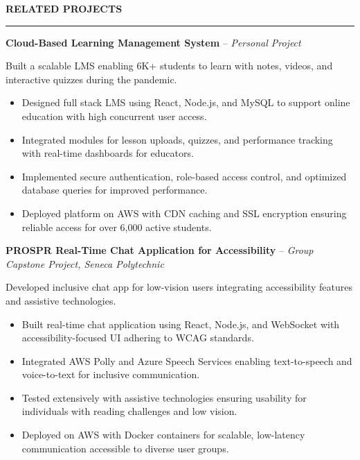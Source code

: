 \documentclass[10pt,letterpaper]{article}
\begin{document}
\vspace{6pt}

\textbf{RELATED PROJECTS}\\[-8pt]
\noindent\rule{\textwidth}{1pt}

\vspace{-2pt}

\textbf{Cloud-Based Learning Management System} -- \emph{Personal Project}

\vspace{-1pt}

Built a scalable LMS enabling 6K+ students to learn with notes, videos, and interactive quizzes during the pandemic.
\vspace{-1pt}
\begin{itemize}
\item Designed full stack LMS using React, Node.js, and MySQL to support online education with high concurrent user access.
\item Integrated modules for lesson uploads, quizzes, and performance tracking with real-time dashboards for educators.
\item Implemented secure authentication, role-based access control, and optimized database queries for improved performance.
\item Deployed platform on AWS with CDN caching and SSL encryption ensuring reliable access for over 6,000 active students.
\end{itemize}

\textbf{PROSPR  Real-Time Chat Application for Accessibility} -- \emph{Group Capstone Project, Seneca Polytechnic}

\vspace{-1pt}

Developed inclusive chat app for low-vision users integrating accessibility features and assistive technologies.
\vspace{-1pt}
\begin{itemize}
\item Built real-time chat application using React, Node.js, and WebSocket with accessibility-focused UI adhering to WCAG standards.
\item Integrated AWS Polly and Azure Speech Services enabling text-to-speech and voice-to-text for inclusive communication.
\item Tested extensively with assistive technologies ensuring usability for individuals with reading challenges and low vision.
\item Deployed on AWS with Docker containers for scalable, low-latency communication accessible to diverse user groups.
\end{itemize}
\end{document}
